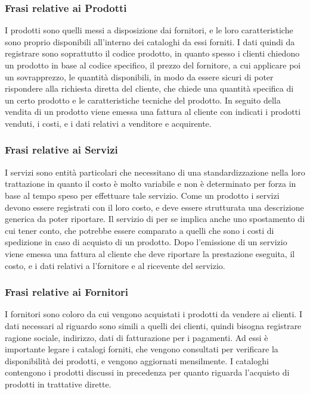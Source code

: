 \subsubsection{Frasi relative ai Prodotti}
I prodotti sono quelli messi a disposizione dai fornitori, e le loro caratteristiche sono proprio disponibili all'interno dei cataloghi da essi forniti. I dati quindi da registrare sono soprattutto il codice prodotto, in quanto spesso i clienti chiedono un prodotto in base al codice specifico, il prezzo del fornitore, a cui applicare poi un sovrapprezzo, le quantità disponibili, in modo da essere sicuri di poter rispondere alla richiesta diretta del cliente, che chiede una quantità specifica di un certo prodotto e le caratteristiche tecniche del prodotto.\newline
In seguito della vendita di un prodotto viene emessa una fattura al cliente con indicati i prodotti venduti, i costi, e i dati relativi a venditore e acquirente.

\subsubsection{Frasi relative ai Servizi}
I servizi sono entità particolari che necessitano di una standardizzazione nella loro trattazione in quanto il costo è molto variabile e non è determinato per forza in base al tempo speso per effettuare tale servizio. Come un prodotto i servizi devono essere registrati con il loro costo, e deve essere strutturata una descrizione generica da poter riportare. Il servizio di per se implica anche uno spostamento di cui tener conto, che potrebbe essere comparato a quelli che sono i costi di spedizione in caso di acquisto di un prodotto.\newline
Dopo l'emissione di un servizio viene emessa una fattura al cliente che deve riportare la prestazione eseguita, il costo, e i dati relativi a l'fornitore e al ricevente del servizio.

\subsubsection{Frasi relative ai Fornitori}
I fornitori sono coloro da cui vengono acquistati i prodotti da vendere ai clienti. I dati necessari al riguardo sono simili a quelli dei clienti, quindi bisogna registrare ragione sociale, indirizzo, dati di fatturazione per i pagamenti. Ad essi è importante legare i catalogi forniti, che vengono consultati per verificare la disponibilità dei prodotti, e vengono aggiornati mensilmente. I cataloghi contengono i prodotti discussi in precedenza per quanto riguarda l'acquisto di prodotti in trattative dirette.

